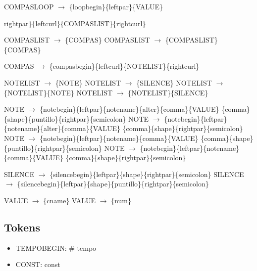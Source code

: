 COMPASLOOP $\rightarrow$ \{loopbegin\}\{leftpar\}\{VALUE\}\ {rightpar\}\{leftcurl\}\{COMPASLIST\}\{rightcurl\}\newline

COMPASLIST $\rightarrow$ \{COMPAS\}\newline
COMPASLIST $\rightarrow$ \{COMPASLIST\}\{COMPAS\}\newline

COMPAS $\rightarrow$ \{compasbegin\}\{leftcurl\}\{NOTELIST\}\{rightcurl\}\newline

NOTELIST $\rightarrow$ \{NOTE\}\newline
NOTELIST $\rightarrow$ \{SILENCE\}\newline
NOTELIST $\rightarrow$ \{NOTELIST\}\{NOTE\}\newline
NOTELIST $\rightarrow$ \{NOTELIST\}\{SILENCE\}\newline

NOTE $\rightarrow$ \{notebegin\}\{leftpar\}\{notename\}\{alter\}\{comma\}\{VALUE\} \{comma\}\{shape\}\{puntillo\}\{rightpar\}\{semicolon\}\newline
NOTE $\rightarrow$ \{notebegin\}\{leftpar\}\{notename\}\{alter\}\{comma\}\{VALUE\} \{comma\}\{shape\}\{rightpar\}\{semicolon\}\newline
NOTE $\rightarrow$ \{notebegin\}\{leftpar\}\{notename\}\{comma\}\{VALUE\} \{comma\}\{shape\}\{puntillo\}\{rightpar\}\{semicolon\}\newline
NOTE $\rightarrow$ \{notebegin\}\{leftpar\}\{notename\}\{comma\}\{VALUE\} \{comma\}\{shape\}\{rightpar\}\{semicolon\}\newline

SILENCE $\rightarrow$ \{silencebegin\}\{leftpar\}\{shape\}\{rightpar\}\{semicolon\}\newline
SILENCE $\rightarrow$ \{silencebegin\}\{leftpar\}\{shape\}\{puntillo\}\{rightpar\}\{semicolon\}\newline

VALUE $\rightarrow$ \{cname\}\newline
VALUE $\rightarrow$ \{num\}\newline

\subsection{Tokens}
\begin{itemize}
\item TEMPOBEGIN: \# tempo

\item CONST: const


\end{itemize}}
